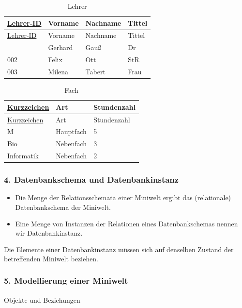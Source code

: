 \documentclass[
  11pt,
  a4paper,
  DIV=11,
  numbers=noendperiod]{scrartcl}
\makeatletter
\let\oldparagraph\paragraph
\renewcommand{\paragraph}{
    \@ifstar
      \xxxParagraphStar
      \xxxParagraphNoStar
  }
\newcommand{\xxxParagraphStar}[1]{\oldparagraph*{#1}\mbox{}}
\newcommand{\xxxParagraphNoStar}[1]{\oldparagraph{#1}\mbox{}}
\providecommand{\tightlist}{%
  \setlength{\itemsep}{0pt}\setlength{\parskip}{0pt}}\usepackage{longtable,booktabs,array}
\makeatother
\begin{document}
\begin{longtable}[]{@{}llll@{}}
\caption{Lehrer}\tabularnewline
\toprule\noalign{}
\ul{Lehrer-ID} & Vorname & Nachname & Tittel \\
\midrule\noalign{}
\endfirsthead
\toprule\noalign{}
\ul{Lehrer-ID} & Vorname & Nachname & Tittel \\
\midrule\noalign{}
\endhead
\bottomrule\noalign{}
\endlastfoot
001 & Gerhard & Gauß & Dr \\
002 & Felix & Ott & StR \\
003 & Milena & Tabert & Frau \\
\end{longtable}

\begin{longtable}[]{@{}lll@{}}
\caption{Fach}\tabularnewline
\toprule\noalign{}
\ul{Kurzzeichen} & Art & Stundenzahl \\
\midrule\noalign{}
\endfirsthead
\toprule\noalign{}
\ul{Kurzzeichen} & Art & Stundenzahl \\
\midrule\noalign{}
\endhead
\bottomrule\noalign{}
\endlastfoot
M & Hauptfach & 5 \\
Bio & Nebenfach & 3 \\
Informatik & Nebenfach & 2 \\
\end{longtable}

\subsubsection{4. Datenbankschema und
Datenbankinstanz}\label{datenbankschema-und-datenbankinstanz}

\begin{itemize}
\tightlist
\item
  Die Menge der Relationsschemata einer Miniwelt ergibt das
  (relationale) Datenbankschema der Miniwelt.
\item
  Eine Menge von Instanzen der Relationen eines Datenbankschemas nennen
  wir Datenbankinstanz.
\end{itemize}

Die Elemente einer Datenbankinstanz müssen sich auf denselben Zustand
der betreffenden Miniwelt beziehen.

\subsubsection{5. Modellierung einer
Miniwelt}\label{modellierung-einer-miniwelt}

\paragraph{Objekte und Beziehungen}\label{objekte-und-beziehungen}
\end{document}
